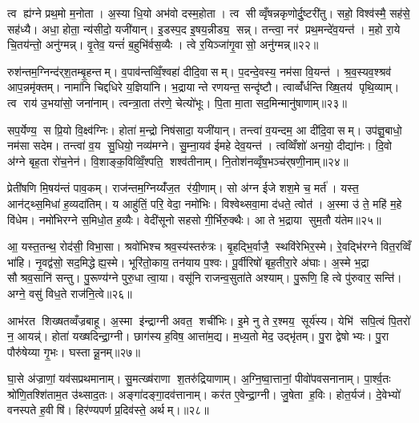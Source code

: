त्व ह्य॑ग्ने प्रथ॒मो म॒नोता। अ॒स्या धि॒यो अभ॑वो दस्म॒होता। त्व सीव्वृँषन्नकृणोर्दु॒ष्टरी॑तु। सहो॒ विश्व॑स्मै॒ सह॑से॒ सह॑ध्यै। अधा॒ होता॒ न्य॑सीदो॒ यजी॑यान्। इ॒डस्प॒द इ॒षय॒न्नीड्य॒ सन्न्। तन्त्वा॒ नर॑ प्रथ॒मन्दे॑व॒यन्त॑। म॒हो रा॒ये चि॒तय॑न्तो॒ अनु॑ग्मन्न्। वृ॒तेव॒ यन्तं॑ ब॒हुभि॑र्वस॒व्यैः। त्वे र॒यिञ्जा॑गृ॒वासो॒ अनु॑ग्मन्न्॥२२॥

रुश॑न्तम॒ग्निन्द॑र्‌श॒तम्बृ॒हन्तम्। व॒पाव॑न्तव्विँ॒श्वहा॑ दीदि॒वासम्। प॒दन्दे॒वस्य॒ नम॑सा वि॒यन्त॑। श्र॒व॒स्यव॒श्श्रव॑ आप॒न्नमृ॑क्तम्। नामा॑नि चिद्दधिरे य॒ज्ञिया॑नि। भ॒द्रायान्ते रणयन्त॒ सन्दृ॑ष्टौ। त्वाव्वँ॑र्धन्ति ख्षि॒तय॑ पृथि॒व्याम्। त्व राय॑ उ॒भया॑सो॒ जना॑नाम्। त्वन्त्रा॒ता त॑रणे॒ चेत्यो॑भूः। पि॒ता मा॒ता सद॒मिन्मानु॑षाणाम्॥२३॥

सप॒र्येण्य॒ स प्रि॒यो वि॒क्ष्व॑ग्निः। होता॑ म॒न्द्रो निष॑सादा॒ यजी॑यान्। तन्त्वा॑ व॒यन्दम॒ आ दी॑दि॒वासम्। उप॑ज्ञु॒बाधो॒ नम॑सा सदेम। तन्त्वा॑ व॒य सु॒धियो॒ नव्य॑मग्ने। सु॒म्ना॒यव॑ ईमहे देव॒यन्त॑। त्वव्विँशो॑ अनयो॒ दीद्या॑नः। दि॒वो अ॑ग्ने बृह॒ता रो॑च॒नेन॑। वि॒शाङ्क॒विव्विँ॒श्पति॒ शश्व॑तीनाम्। नि॒तोश॑नव्वृँष॒भञ्च॑र्‌षणी॒नाम्॥२४॥

प्रेती॑षणि मि॒षय॑न्तं पाव॒कम्। राज॑न्तम॒ग्निय्यँ॑ज॒त र॑यी॒णाम्। सो अ॑ग्न ईजे शश॒मे च॒ मर्त॑। यस्त॒ आन॑ट्थ्स॒मिधा॑ ह॒व्यदा॑तिम्। य आहु॑तिं॒ परि॒ वेदा॒ नमो॑भिः। विश्वेथ्सवा॒मा द॑धते॒ त्वोत॑। अ॒स्मा उ॑ ते॒ महि॑ म॒हे वि॑धेम। नमो॑भिरग्ने स॒मिधो॒त ह॒व्यैः। वेदी॑सूनो सहसो गी॒र्भिरु॒क्थैः। आ ते भ॒द्राया सुम॒तौ य॑तेम॥२५॥

आ॒ यस्त॒तन्थ॒ रोद॑सी॒ विभा॒सा। श्रवो॑भिश्च श्रव॒स्य॑स्तरु॑त्रः। बृ॒हद्भि॒र्वाजै॒ स्थवि॑रेभिर॒स्मे। रे॒वद्भि॑रग्ने वित॒रव्विँ भा॑हि। नृ॒वद्व॑सो॒ सद॒मिद्धेह्य॒स्मे। भूरि॑तो॒काय॒ तन॑याय प॒श्वः। पू॒र्वीरिषो॑ बृह॒तीरा॒रे अ॑घाः। अ॒स्मे भ॒द्रा सौश्रव॒सानि॑ सन्तु। पु॒रूण्य॑ग्ने पुरु॒धा त्वा॒या। वसू॑नि राजन्व॒सुता॑ते अश्याम्। पु॒रूणि॒ हि त्वे पु॑रुवार॒ सन्ति॑। अग्ने॒ वसु॑ विध॒ते राज॑नि॒त्वे॥२६॥\anuvakamend[जा॒गृ॒वासो॒ अनु॑ग्म॒न्मानु॑षाणाञ्चर्‌षणी॒नाय्यँ॑तेमाश्या॒न्द्वे च॑]

आभ॑रत शिख्षतव्वँज्रबाहू। अ॒स्मा इ॑न्द्राग्नी अवत॒ शची॑भिः। इ॒मे नु ते र॒श्मय॒ सूर्य॑स्य। येभि॑ सपि॒त्वं पि॒तरो॑ न॒ आयन्न्॑। होता॑ यख्षदिन्द्रा॒ग्नी। छाग॑स्य ह॒विष॒ आत्ता॑म॒द्य। म॒ध्य॒तो मेद॒ उद्भृ॑तम्। पु॒रा द्वेषोभ्यः। पु॒रा पौरु॑षेय्या गृ॒भः। घस्तान्नू॒नम्॥२७॥

घा॒से अ॑ज्राणां॒ यव॑सप्रथमानाम्। सु॒मत्ख्ष॑राणा श॒तरु॑द्रियाणाम्। अ॒ग्नि॒ष्वा॒त्तानां॒ पीवो॑पवसनानाम्। पा॒र्श्व॒तः श्रो॑णि॒तश्शि॑ताम॒त उ॑थ्साद॒तः। अङ्गा॑दङ्गा॒दव॑त्तानाम्। कर॑त ए॒वेन्द्रा॒ग्नी। जु॒षेता ह॒विः। होत॒र्यज॑। दे॒वेभ्यो॑ वनस्पते ह॒वीषि॑। हिर॑ण्यपर्ण प्र॒दिव॑स्ते॒ अर्थम्।॥२८॥


